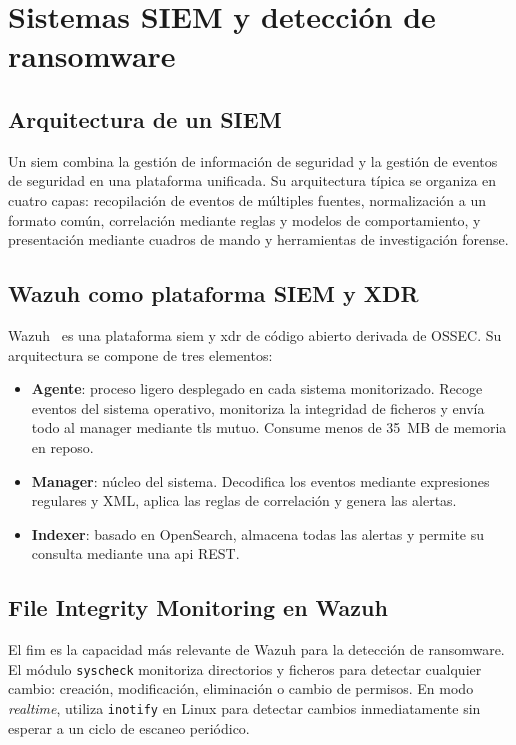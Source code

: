 \documentclass[../main.tex]{subfiles}
\begin{document}
\section{Sistemas SIEM y detección de ransomware}

\subsection{Arquitectura de un SIEM}

Un \gls{siem} combina la gestión de información de seguridad y la gestión
de eventos de seguridad en una plataforma unificada. Su arquitectura
típica se organiza en cuatro capas: recopilación de eventos de múltiples
fuentes, normalización a un formato común, correlación mediante reglas y
modelos de comportamiento, y presentación mediante cuadros de mando y
herramientas de investigación forense.

\subsection{Wazuh como plataforma SIEM y XDR}

Wazuh~\cite{wazuh2024} es una plataforma \gls{siem} y \gls{xdr} de código
abierto derivada de OSSEC. Su arquitectura se compone de tres elementos:

\begin{itemize}
  \item \textbf{Agente}: proceso ligero desplegado en cada sistema
  monitorizado. Recoge eventos del sistema operativo, monitoriza la
  integridad de ficheros y envía todo al manager mediante \gls{tls} mutuo.
  Consume menos de 35~MB de memoria en reposo.

  \item \textbf{Manager}: núcleo del sistema. Decodifica los eventos
  mediante expresiones regulares y XML, aplica las reglas de correlación
  y genera las alertas.

  \item \textbf{Indexer}: basado en OpenSearch, almacena todas las alertas
  y permite su consulta mediante una \gls{api} REST.
\end{itemize}

\subsection{File Integrity Monitoring en Wazuh}

El \gls{fim} es la capacidad más relevante de Wazuh para la detección de
ransomware. El módulo \texttt{syscheck} monitoriza directorios y ficheros
para detectar cualquier cambio: creación, modificación, eliminación o
cambio de permisos. En modo \textit{realtime}, utiliza \texttt{inotify}
en Linux para detectar cambios inmediatamente sin esperar a un ciclo de
escaneo periódico.
\end{document}
